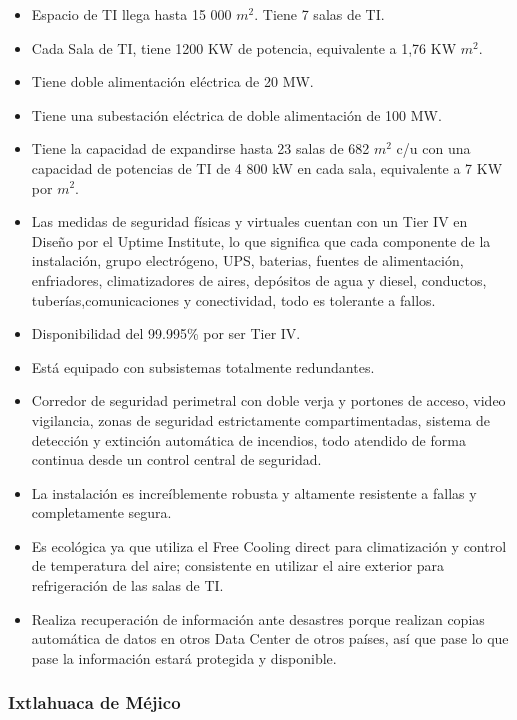 \documentclass{article}
\begin{document}
\begin{itemize}
\item Espacio de TI llega hasta 15 000 $m^2$.
Tiene 7 salas de TI.
\item Cada Sala de TI, tiene 1200 KW de potencia, equivalente a 1,76 KW $m^2$.
\item Tiene doble alimentación eléctrica de 20 MW.
\item Tiene una subestación eléctrica de doble alimentación de 100 MW.
\item Tiene la capacidad de expandirse hasta 23 salas de 682 $m^2$ c/u con una capacidad de potencias de TI de 4 800 kW en cada sala, equivalente a 7 KW por $m^2$.
\item Las medidas de seguridad físicas y virtuales cuentan con un Tier IV en Diseño por el Uptime Institute, lo que significa que cada componente de la instalación, grupo electrógeno, UPS, baterias, fuentes de alimentación, enfriadores, climatizadores de aires, depósitos de agua y diesel, conductos, tuberías,comunicaciones y conectividad, todo es tolerante a fallos.
\item Disponibilidad del 99.995\% por ser Tier IV.
\item Está equipado con subsistemas totalmente redundantes.
\item Corredor de seguridad perimetral con doble verja y portones de acceso, video vigilancia, zonas de seguridad estrictamente compartimentadas, sistema de detección y extinción automática de incendios, todo atendido de forma continua desde un control central de seguridad.
\item La instalación es increíblemente robusta y altamente resistente a fallas y completamente segura.
\item Es ecológica ya que utiliza el Free Cooling direct para climatización y control de temperatura del aire; consistente en utilizar el aire exterior para refrigeración de las salas  de TI.
\item Realiza recuperación de información ante desastres porque realizan copias automática de datos en otros Data Center de otros países, así que pase lo que pase la información estará protegida y disponible.
\end{itemize}

	
	
	
\subsubsection{Ixtlahuaca de Méjico}
\end{document}
